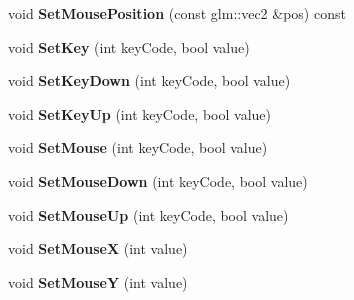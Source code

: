 \begin{DoxyCompactItemize}
\item 
\hypertarget{class_z_e_g_l_1_1_input_a7f0a253602b8ef56bc0beef06aed0369}{}void {\bfseries Set\+Mouse\+Position} (const glm\+::vec2 \&pos) const \label{class_z_e_g_l_1_1_input_a7f0a253602b8ef56bc0beef06aed0369}

\item 
\hypertarget{class_z_e_g_l_1_1_input_a605ff73b4ac872d8c9a59ad7766400d1}{}void {\bfseries Set\+Key} (int key\+Code, bool value)\label{class_z_e_g_l_1_1_input_a605ff73b4ac872d8c9a59ad7766400d1}

\item 
\hypertarget{class_z_e_g_l_1_1_input_abafd54e7337659eece02aeb52fded0cd}{}void {\bfseries Set\+Key\+Down} (int key\+Code, bool value)\label{class_z_e_g_l_1_1_input_abafd54e7337659eece02aeb52fded0cd}

\item 
\hypertarget{class_z_e_g_l_1_1_input_a6ddbbe3b8b2a9742d8aee2a95fd04430}{}void {\bfseries Set\+Key\+Up} (int key\+Code, bool value)\label{class_z_e_g_l_1_1_input_a6ddbbe3b8b2a9742d8aee2a95fd04430}

\item 
\hypertarget{class_z_e_g_l_1_1_input_a12b2ecb29bed872fba695c6c4e1d9d5b}{}void {\bfseries Set\+Mouse} (int key\+Code, bool value)\label{class_z_e_g_l_1_1_input_a12b2ecb29bed872fba695c6c4e1d9d5b}

\item 
\hypertarget{class_z_e_g_l_1_1_input_a13e74f01b177aa8a2447d687440a7347}{}void {\bfseries Set\+Mouse\+Down} (int key\+Code, bool value)\label{class_z_e_g_l_1_1_input_a13e74f01b177aa8a2447d687440a7347}

\item 
\hypertarget{class_z_e_g_l_1_1_input_af1b6031541d0e78eb4cd465925a5c901}{}void {\bfseries Set\+Mouse\+Up} (int key\+Code, bool value)\label{class_z_e_g_l_1_1_input_af1b6031541d0e78eb4cd465925a5c901}

\item 
\hypertarget{class_z_e_g_l_1_1_input_abcbd33afe4e22d29a4049496e28a2a9d}{}void {\bfseries Set\+Mouse\+X} (int value)\label{class_z_e_g_l_1_1_input_abcbd33afe4e22d29a4049496e28a2a9d}

\item 
\hypertarget{class_z_e_g_l_1_1_input_a110a102675d308e6f51a4bbc166f3100}{}void {\bfseries Set\+Mouse\+Y} (int value)\label{class_z_e_g_l_1_1_input_a110a102675d308e6f51a4bbc166f3100}

\end{DoxyCompactItemize}
